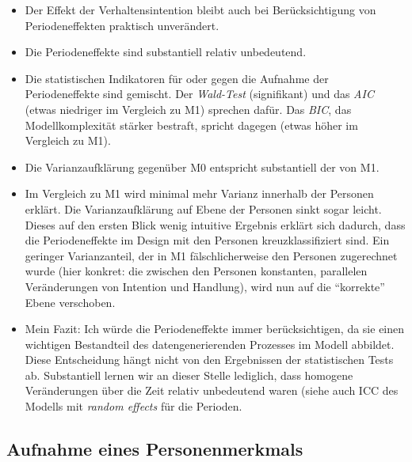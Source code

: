 \documentclass[
]{book}
\newenvironment{Shaded}{\begin{snugshade}}{\end{snugshade}}
\newcommand{\CommentTok}[1]{\textcolor[rgb]{0.56,0.35,0.01}{\textit{#1}}}
\newcommand{\DataTypeTok}[1]{\textcolor[rgb]{0.13,0.29,0.53}{#1}}
\newcommand{\DecValTok}[1]{\textcolor[rgb]{0.00,0.00,0.81}{#1}}
\newcommand{\KeywordTok}[1]{\textcolor[rgb]{0.13,0.29,0.53}{\textbf{#1}}}
\newcommand{\NormalTok}[1]{#1}
\newcommand{\OperatorTok}[1]{\textcolor[rgb]{0.81,0.36,0.00}{\textbf{#1}}}
\newcommand{\OtherTok}[1]{\textcolor[rgb]{0.56,0.35,0.01}{#1}}
\newcommand{\StringTok}[1]{\textcolor[rgb]{0.31,0.60,0.02}{#1}}
\providecommand{\tightlist}{%
  \setlength{\itemsep}{0pt}\setlength{\parskip}{0pt}}
\begin{document}
\begin{itemize}
\tightlist
\item
  Der Effekt der Verhaltensintention bleibt auch bei Berücksichtigung von Periodeneffekten praktisch unverändert.
\item
  Die Periodeneffekte sind substantiell relativ unbedeutend.
\item
  Die statistischen Indikatoren für oder gegen die Aufnahme der Periodeneffekte sind gemischt. Der \emph{Wald-Test} (signifikant) und das \emph{AIC} (etwas niedriger im Vergleich zu M1) sprechen dafür. Das \emph{BIC}, das Modellkomplexität stärker bestraft, spricht dagegen (etwas höher im Vergleich zu M1).
\item
  Die Varianzaufklärung gegenüber M0 entspricht substantiell der von M1.
\item
  Im Vergleich zu M1 wird minimal mehr Varianz innerhalb der Personen erklärt. Die Varianzaufklärung auf Ebene der Personen sinkt sogar leicht. Dieses auf den ersten Blick wenig intuitive Ergebnis erklärt sich dadurch, dass die Periodeneffekte im Design mit den Personen kreuzklassifiziert sind. Ein geringer Varianzanteil, der in M1 fälschlicherweise den Personen zugerechnet wurde (hier konkret: die zwischen den Personen konstanten, parallelen Veränderungen von Intention und Handlung), wird nun auf die ``korrekte'' Ebene verschoben.
\item
  Mein Fazit: Ich würde die Periodeneffekte immer berücksichtigen, da sie einen wichtigen Bestandteil des datengenerierenden Prozesses im Modell abbildet. Diese Entscheidung hängt nicht von den Ergebnissen der statistischen Tests ab. Substantiell lernen wir an dieser Stelle lediglich, dass homogene Veränderungen über die Zeit relativ unbedeutend waren (siehe auch ICC des Modells mit \emph{random effects} für die Perioden.
\end{itemize}

\hypertarget{aufnahme-eines-personenmerkmals}{%
\subsection*{Aufnahme eines Personenmerkmals}\label{aufnahme-eines-personenmerkmals}}

\begin{Shaded}
\end{Shaded}
\end{document}
